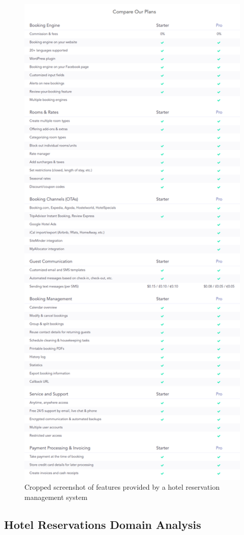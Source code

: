 \begin{figure}[htbp]
  \centering
  \includegraphics[width=0.7\linewidth]{include/sirvoy.png}
  \caption{Cropped screenshot of features provided by a hotel reservation management system\cite{2dv603:assignment1-sirvoy}}
  \label{fig:sirvoy}
\end{figure}



\subsection{Hotel Reservations Domain Analysis}
%
%

